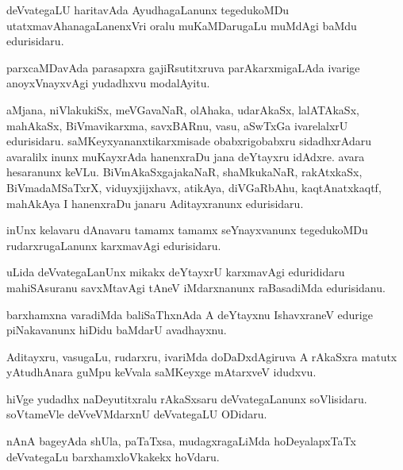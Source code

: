 \begin{mng}
deVvategaLU haritavAda AyudhagaLanunx tegedukoMDu utatxmavAhanagaLanenxVri oralu muKaMDarugaLu muMdAgi baMdu edurisidaru.
\end{mng}

\begin{mng}
parxcaMDavAda parasapxra gajiRsutitxruva parAkarxmigaLAda ivarige anoyxVnayxvAgi yudadhxvu modalAyitu.
\end{mng}

\begin{mng}
aMjana, niVlakukiSx, meVGavaNaR, olAhaka, udarAkaSx, lalATAkaSx, mahAkaSx, BiVmavikarxma, savxBARnu, vasu, aSwTxGa ivarelalxrU edurisidaru. saMKeyxyananxtikarxmisade obabxrigobabxru sidadhxrAdaru avaralilx inunx muKayxrAda hanenxraDu jana deYtayxru idAdxre. avara hesaranunx keVLu. BiVmAkaSxgajakaNaR, shaMkukaNaR, rakAtxkaSx, BiVmadaMSaTxrX, viduyxjijxhavx, atikAya, diVGaRbAhu, kaqtAnatxkaqtf, mahAkAya I hanenxraDu janaru Aditayxranunx edurisidaru.
\end{mng}

\begin{mng}
inUnx kelavaru dAnavaru tamamx tamamx seYnayxvanunx tegedukoMDu rudarxrugaLanunx karxmavAgi edurisidaru.
\end{mng}

\begin{mng}
uLida deVvategaLanUnx mikakx deYtayxrU karxmavAgi edurididaru mahiSAsuranu savxMtavAgi tAneV iMdarxnanunx raBasadiMda edurisidanu.
\end{mng}

\begin{mng}
barxhamxna varadiMda baliSaThxnAda A deYtayxnu IshavxraneV edurige piNakavanunx hiDidu baMdarU avadhayxnu.
\end{mng}

\begin{mng}
Aditayxru, vasugaLu, rudarxru, ivariMda doDaDxdAgiruva A rAkaSxra matutx yAtudhAnara guMpu keVvala saMKeyxge mAtarxveV idudxvu.
\end{mng}

\begin{mng}
hiVge yudadhx naDeyutitxralu rAkaSxsaru deVvategaLanunx soVlisidaru. soVtameVle deVveVMdarxnU deVvategaLU ODidaru.
\end{mng}

\begin{mng}
nAnA bageyAda shUla, paTaTxsa, mudagxragaLiMda hoDeyalapxTaTx deVvategaLu barxhamxloVkakekx hoVdaru.
\end{mng}

